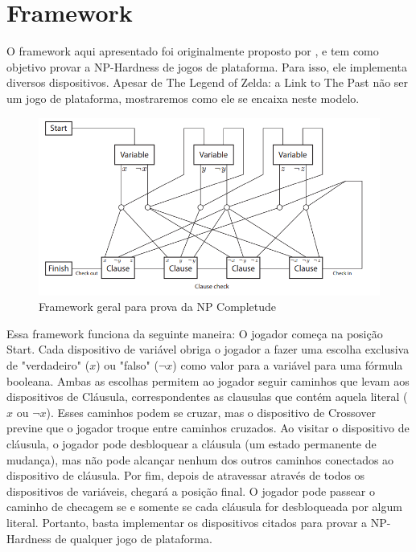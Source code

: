 \section{Framework}

O framework aqui apresentado foi originalmente proposto por \cite{aloupis2015classic}, e tem
como objetivo provar a NP-Hardness de jogos de plataforma. Para isso, ele implementa diversos dispositivos.
Apesar de The Legend of Zelda: a Link to The Past não ser um jogo de plataforma, mostraremos como ele se encaixa neste modelo.

\begin{figure}[!htb]
     \centering
     \includegraphics[scale=0.5]{framework.png}
     \caption{Framework geral para prova da NP Completude}
\end{figure}

Essa framework funciona da seguinte maneira: O jogador começa na posição Start. 
Cada dispositivo de variável obriga o jogador a fazer uma escolha
exclusiva de "verdadeiro" (\(x\)) ou "falso" (\(\lnot x\)) como valor para a variável para uma fórmula booleana. Ambas as escolhas
permitem ao jogador seguir caminhos que levam aos dispositivos de Cláusula, correspondentes as clausulas
que contém aquela literal (\(x\) ou \(\lnot x\)). Esses caminhos podem se cruzar, mas o dispositivo de Crossover
previne que o jogador troque entre caminhos cruzados. Ao visitar o dispositivo de cláusula, o jogador pode
desbloquear a cláusula (um estado permanente de mudança), mas não pode alcançar nenhum dos outros caminhos
conectados ao dispositivo de cláusula. Por fim, depois de atravessar através de todos os dispositivos de variáveis,
chegará a posição final. O jogador pode passear o caminho de checagem se e somente se cada cláusula for desbloqueada
por algum literal. Portanto, basta implementar os dispositivos citados para provar a NP-Hardness de qualquer jogo de plataforma.

